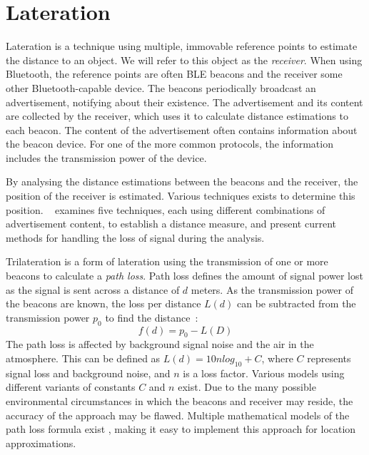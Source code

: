 \section{Lateration}
Lateration is a technique using multiple, immovable reference points to estimate the distance to an object\cite{presence_ble_review}.
We will refer to this object as the \textit{receiver}.
When using Bluetooth, the reference points are often BLE beacons and the receiver some other Bluetooth-capable device. 
The beacons periodically broadcast an advertisement, notifying about their existence.\cite{apple2023ibeacon} 
The advertisement and its content are collected by the receiver, which uses it to calculate distance estimations to each beacon. 
The content of the advertisement often contains information about the beacon device. 
For one of the more common protocols, the information includes the transmission power of the device\cite{apple2023ibeacon}.

By analysing the distance estimations between the beacons and the receiver, the position of the receiver is estimated.
Various techniques exists to determine this position.
\citeauthor{presence_ble_review}~\cite{presence_ble_review} examines five techniques, each using different combinations of advertisement content, to establish a distance measure, and present current methods for handling the loss of signal during the analysis.

Trilateration is a form of lateration using the transmission of one or more beacons to calculate a \textit{path loss}.
Path loss defines the amount of signal power lost as the signal is sent across a distance of $d$ meters.
As the transmission power of the beacons are known, the loss per distance $L(d)$ can be subtracted from the transmission power $p_0$ to find the distance~\cite{taking_localization_to_the_wild}:
\begin{equation}
    f(d) = p_0 - L(D)
\end{equation}
The path loss is affected by background signal noise and the air in the atmosphere.
This can be defined as $L(d) = 10n log_{10}+C$, where $C$ represents signal loss and background noise, and $n$ is a loss factor. \cite{presence_ble_review}
Various models using different variants of constants $C$ and $n$ exist\cite {path_loss_models}.
Due to the many possible environmental circumstances in which the beacons and receiver may reside, the accuracy of the approach may be flawed\cite{presence_ble_review}. 
Multiple mathematical models of the path loss formula exist \cite{rssi_indoor_pos,positioning_alg_rssi, RSSI_ZigBee_distance}, making it easy to implement this approach for location approximations.